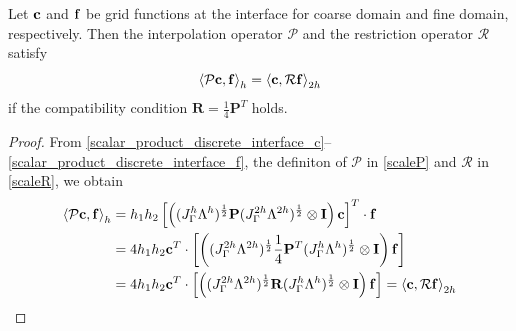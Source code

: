  \begin{lemma}\label{lemma1}
 	Let ${\bf c}$ and ${\bf f}$ be grid functions at the interface for coarse domain and fine domain, respectively. Then the interpolation operator $\mathcal{P}$ and the restriction operator $\mathcal{R}$ satisfy
 	\begin{equation}\label{pr_relation}
 	\left<\mathcal{P} {\bf c}, {\bf f}\right>_h = \left<{\bf c}, \mathcal{R}{\bf f}\right>_{2h}
 	\end{equation}
 	if the compatibility condition $\bm{R} = \frac{1}{4}\bm{P}^T$ holds. 
 \end{lemma}
 \begin{proof}
 	From \eqref{scalar_product_discrete_interface_c}--\eqref{scalar_product_discrete_interface_f}, the definiton of $\mathcal{P}$ in \eqref{scaleP} and $\mathcal{R}$ in \eqref{scaleR}, we obtain
 	\begin{align*}
 	\left<\mathcal{P}{\bf c}, {\bf f}\right>_h &= h_1h_2\left[\left((J_{\Gamma}^h\Lambda^h)^{\frac{1}{2}} {\bf P}(J_{\Gamma}^{2h}\Lambda^{2h})^{\frac{1}{2}}\otimes {\bf I}\right){\bf c}\right]^T\cdot{\bf f}\\
 	& = 4h_1h_2 {\bf c}^T \cdot \left[\left((J_{\Gamma}^{2h}\Lambda^{2h})^{\frac{1}{2}}\frac{1}{4}{\bf P}^T(J_{\Gamma}^h\Lambda^h)^{\frac{1}{2}}\otimes {\bf I}\right) {\bf f}\right]\\
 	& =4h_1h_2 {\bf c}^T \cdot \left[\left((J_{\Gamma}^{2h}\Lambda^{2h})^{\frac{1}{2}}{\bf R}(J_{\Gamma}^h\Lambda^h)^{\frac{1}{2}}\otimes {\bf I}\right) {\bf f}\right] = \left<{\bf c}, \mathcal{R}{\bf f}\right>_{2h}
 	\end{align*}
 \end{proof}
 

